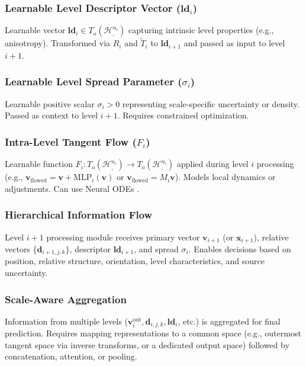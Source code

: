 \documentclass[11pt, twoside]{article} %
\newcommand{\HypSpace}[3]{\mathcal{H}^{#1}_{#2, #3}} %
\begin{document}
\subsubsection{Learnable Level Descriptor Vector ($\mathbf{ld}_i$)}
\label{ssubsec:level_descriptor}
Learnable vector $\mathbf{ld}_i \in T_o(\HypSpace{n_i}{}{})$ capturing intrinsic level properties (e.g., anisotropy). Transformed via $R_i$ and $\tilde{T}_i$ to $\mathbf{ld}_{i+1}$ and passed as input to level $i+1$.

\subsubsection{Learnable Level Spread Parameter ($\sigma_i$)}
\label{ssubsec:level_spread}
Learnable positive scalar $\sigma_i > 0$ representing scale-specific uncertainty or density. Passed as context to level $i+1$. Requires constrained optimization.

\subsubsection{Intra-Level Tangent Flow ($F_i$)}
\label{ssubsec:tangent_flow}
Learnable function $F_i: T_o(\HypSpace{n_i}{}{}) \rightarrow T_o(\HypSpace{n_i}{}{})$ applied during level $i$ processing (e.g., $\mathbf{v}_{\text{flowed}} = \mathbf{v} + \text{MLP}_i(\mathbf{v})$ or $\mathbf{v}_{\text{flowed}} = M_i \mathbf{v}$). Models local dynamics or adjustments. Can use Neural ODEs \cite{ChenEtAl2018}.

\subsubsection{Hierarchical Information Flow}
\label{ssubsec:info_flow}
Level $i+1$ processing module receives primary vector $\mathbf{v}_{i+1}$ (or $\mathbf{x}_{i+1}$), relative vectors $\{\mathbf{d}_{i+1, j, k}\}$, descriptor $\mathbf{ld}_{i+1}$, and spread $\sigma_i$. Enables decisions based on position, relative structure, orientation, level characteristics, and source uncertainty.

\subsubsection{Scale-Aware Aggregation}
\label{ssubsec:aggregation}
Information from multiple levels ($\mathbf{v}_i^{\text{out}}, \mathbf{d}_{i,j,k}, \mathbf{ld}_i$, etc.) is aggregated for final prediction. Requires mapping representations to a common space (e.g., outermost tangent space via inverse transforms, or a dedicated output space) followed by concatenation, attention, or pooling.
\end{document}
